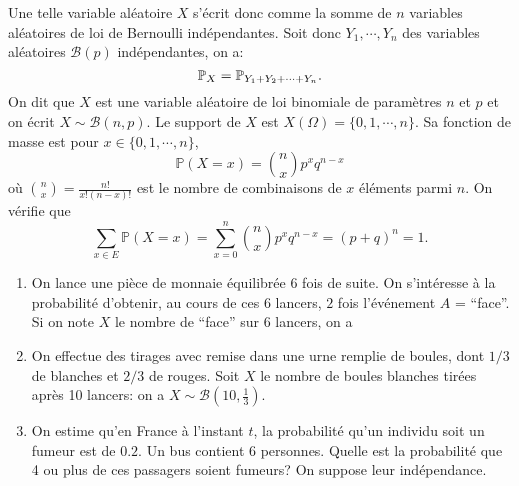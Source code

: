 	Une telle variable aléatoire $X$ s'écrit donc comme la somme de $n$ variables aléatoires de loi de Bernoulli indépendantes.  Soit donc $Y_1,\cdots,Y_n$ des variables aléatoires $\mathcal B(p)$ indépendantes, on a: 
	\[
		\P_X = \P_{Y_1 + Y_2 + \cdots + Y_n}.
\]\sld{\vfill\pagebreak[5]}%
On dit que $X$ est une variable aléatoire de loi binomiale de paramètres $n$ et $p$ et on écrit $X \sim \mathcal{B}(n, p)$. Le support de $X$ est  $X(\Omega) = \{0, 1, \cdots, n\}$. Sa fonction de masse est pour $x \in \{0, 1,\cdots,n\}$,
\[ \mathbb{P}(X=x) = \binom{n}{x} p^x q^{n-x} \]
 où $\binom{n}{x}=\frac{n!}{x! (n-x)!}$ est le nombre de combinaisons de $x$ éléments parmi $n$. On vérifie que 
\[ \sum_{x \in E} \mathbb{P}(X=x) =  \sum_{x=0}^n \binom n x p^x q^{n-x} = (p+q)^n =1.\]\sld{\vfill\pagebreak[5]}%
\begin{center}
	
\end{center}
\sld{\vfill\pagebreak[5]}%
\begin{exemple}
	\begin{enumerate}
		\item On lance une pièce de monnaie équilibrée $6$ fois de suite. On s'intéresse à la probabilité d'obtenir, au cours de ces $6$ lancers, $2$ fois l'événement $A$ =  ``face''. Si on note $X$ le nombre de ``face'' sur 6 lancers, on  a 
		 \pl{\rep{1.5cm}}
		\item On effectue des tirages avec remise dans une urne remplie de boules, dont $1/3$ de blanches et $2/3$ de rouges. Soit $X$ le nombre de boules blanches tirées après 10 lancers: on a $X \sim \mathcal{B} (10, \frac{1}{3})$.
\sld{\vfill\pagebreak[5]}%
		\item On estime qu'en France à l'instant $t$, la probabilité qu'un individu soit un fumeur est de $0.2$. Un bus contient 6 personnes. Quelle est la probabilité que 4 ou plus de ces passagers soient fumeurs? On suppose leur indépendance. 
		\pl{\rep{3.5cm}}
	\end{enumerate}
\end{exemple}
\sld{\vfill\pagebreak[5]}%
